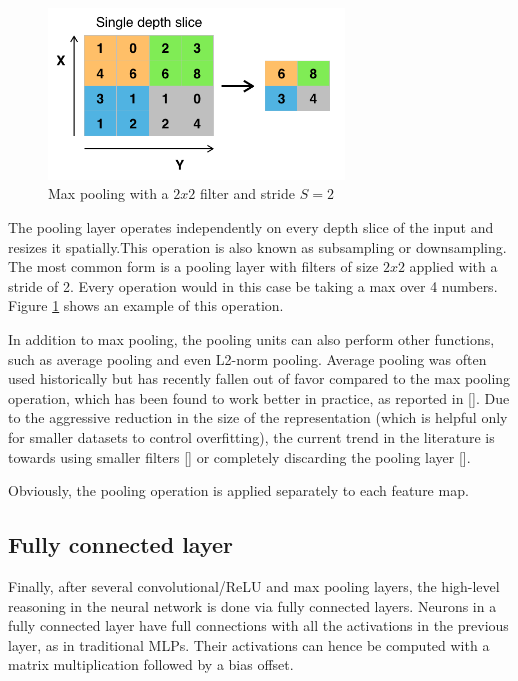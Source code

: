 \begin{figure}[b]
	\centering
	\includegraphics[width=0.7\textwidth]{Images/max_pooling}
	\caption{Max pooling with a $2x2$ filter and stride $S=2$}\label{fig:max_pooling}
\end{figure}

The pooling layer operates independently on every depth slice of the input and resizes it spatially.This operation is also known as subsampling or downsampling. The most common form is a pooling layer with filters of size $2x2$ applied with a stride of 2. Every operation would in this case be taking a max over 4 numbers. Figure \ref{fig:max_pooling} shows an example of this operation.

In addition to max pooling, the pooling units can also perform other functions, such as average pooling and even L2-norm pooling. Average pooling was often used historically but has recently fallen out of favor compared to the max pooling operation, which has been found to work better in practice, as reported in [\cite{Scherer:2010}].
Due to the aggressive reduction in the size of the representation (which is helpful only for smaller datasets to control overfitting), the current trend in the literature is towards using smaller filters [\cite{DBLP:journals/corr/Graham14a}] or completely discarding the pooling layer [\cite{DBLP:journals/corr/SpringenbergDBR14}].

Obviously, the pooling operation is applied separately to each feature map.

\subsection{Fully connected layer}

Finally, after several convolutional/\ac{ReLU} and max pooling layers, the high-level reasoning in the neural network is done via fully connected layers. Neurons in a fully connected layer have full connections with all the activations in the previous layer, as in traditional \acsp{MLP}. Their activations can hence be computed with a matrix multiplication followed by a bias offset.

